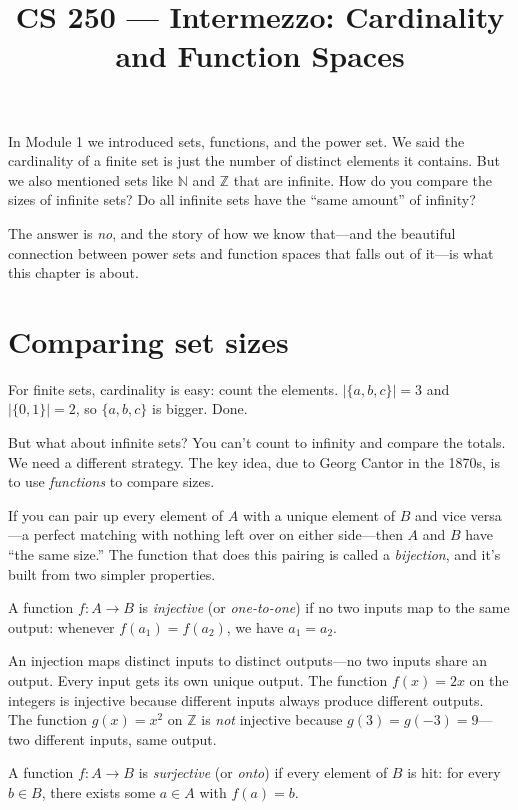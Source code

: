 \documentclass[11pt]{article}
\title{CS 250 --- Intermezzo: Cardinality and Function Spaces}
\author{}
\date{}
\begin{document}
\maketitle

In Module 1 we introduced sets, functions, and the power set. We said the cardinality of a finite set is just the number of distinct elements it contains. But we also mentioned sets like $\mathbb{N}$ and $\mathbb{Z}$ that are infinite. How do you compare the sizes of infinite sets? Do all infinite sets have the ``same amount'' of infinity?

The answer is \emph{no}, and the story of how we know that---and the beautiful connection between power sets and function spaces that falls out of it---is what this chapter is about.

\section{Comparing set sizes}

For finite sets, cardinality is easy: count the elements. $|\{a,b,c\}| = 3$ and $|\{0,1\}| = 2$, so $\{a,b,c\}$ is bigger. Done.

But what about infinite sets? You can't count to infinity and compare the totals. We need a different strategy. The key idea, due to Georg Cantor in the 1870s, is to use \emph{functions} to compare sizes.

If you can pair up every element of $A$ with a unique element of $B$ and vice versa---a perfect matching with nothing left over on either side---then $A$ and $B$ have ``the same size.'' The function that does this pairing is called a \emph{bijection}, and it's built from two simpler properties.

\begin{definition}
A function $f : A \to B$ is \emph{injective} (or \emph{one-to-one}) if no two inputs map to the same output: whenever $f(a_1) = f(a_2)$, we have $a_1 = a_2$.
\end{definition}

An injection maps distinct inputs to distinct outputs---no two inputs share an output. Every input gets its own unique output. The function $f(x) = 2x$ on the integers is injective because different inputs always produce different outputs. The function $g(x) = x^2$ on $\mathbb{Z}$ is \emph{not} injective because $g(3) = g(-3) = 9$---two different inputs, same output.

\begin{definition}
A function $f : A \to B$ is \emph{surjective} (or \emph{onto}) if every element of $B$ is hit: for every $b \in B$, there exists some $a \in A$ with $f(a) = b$.
\end{definition}
\end{document}
